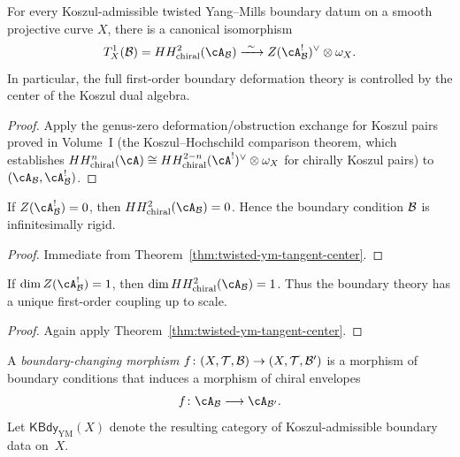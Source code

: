 \begin{theorem}
For every Koszul-admissible twisted Yang--Mills boundary datum on a smooth projective
curve $X$, there is a canonical isomorphism
\[
T^1_X(\cB)
= HH^2_{\mathrm{chiral}}(\cA_{\cB})
\xrightarrow{\ \sim\ }
Z(\cA_{\cB}^!)^{\vee} \otimes \omega_X.
\]
In particular, the full first-order boundary deformation theory is controlled by the center
of the Koszul dual algebra.
\end{theorem}

\begin{proof}
Apply the genus-zero deformation/obstruction exchange for Koszul pairs
proved in Volume~I (the Koszul--Hochschild comparison theorem, which establishes
$HH^n_{\mathrm{chiral}}(\cA) \cong HH^{2-n}_{\mathrm{chiral}}(\cA^!)^{\vee}\otimes \omega_X$
for chirally Koszul pairs) to $(\cA_{\cB}, \cA_{\cB}^!)$.
\end{proof}

\begin{corollary}
\label{cor:twisted-ym-center-rigidity}
If $Z(\cA_{\cB}^!) = 0$, then $HH^2_{\mathrm{chiral}}(\cA_{\cB}) = 0$.
Hence the boundary condition $\mathcal{B}$ is infinitesimally rigid.
\end{corollary}

\begin{proof}
Immediate from Theorem~\ref{thm:twisted-ym-tangent-center}.
\end{proof}

\begin{corollary}
\label{cor:twisted-ym-one-parameter}
If $\dim Z(\cA_{\cB}^!) = 1$, then $\dim HH^2_{\mathrm{chiral}}(\cA_{\cB}) = 1$.
Thus the boundary theory has a unique first-order coupling up to scale.
\end{corollary}

\begin{proof}
Again apply Theorem~\ref{thm:twisted-ym-tangent-center}.
\end{proof}

\begin{definition}
\label{def:twisted-ym-boundary-morphism}
A \emph{boundary-changing morphism}
$f \colon (X,\mathcal{T},\mathcal{B}) \to (X,\mathcal{T},\mathcal{B}')$
is a morphism of boundary conditions that induces a morphism of chiral envelopes
\[
f \colon \cA_{\cB} \longrightarrow \cA_{\cB'}.
\]
Let $\mathsf{KBdy}_{\mathrm{YM}}(X)$ denote the resulting category of Koszul-admissible
boundary data on~$X$.
\end{definition}

